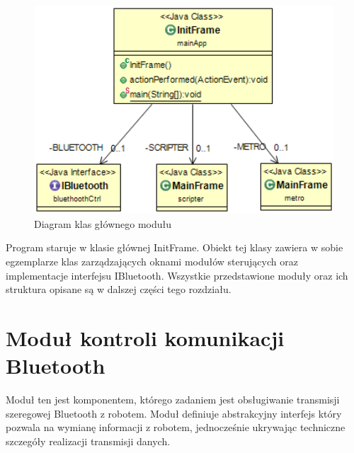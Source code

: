 \documentclass[eng,printmode]{mgr}
\begin{document}
   \begin{figure}[ht]
    \centering
    \includegraphics[width=1\textwidth]{images/main}
    \caption{Diagram klas głównego modułu}
    \label{fig:main}
   \end{figure}

Program staruje w klasie głównej InitFrame. Obiekt tej klasy zawiera w sobie egzemplarze klas zarządzających oknami modułów sterujących oraz implementacje interfejsu IBluetooth. Wszystkie przedstawione moduły oraz ich struktura opisane są w dalszej części tego rozdziału. 

 \section{Moduł kontroli komunikacji Bluetooth}

Moduł ten jest komponentem, którego zadaniem jest obsługiwanie transmisji szeregowej Bluetooth z robotem. Moduł definiuje abstrakcyjny interfejs który pozwala na wymianę informacji z robotem, jednocześnie ukrywając techniczne szczegóły realizacji transmisji danych. 
\end{document}
